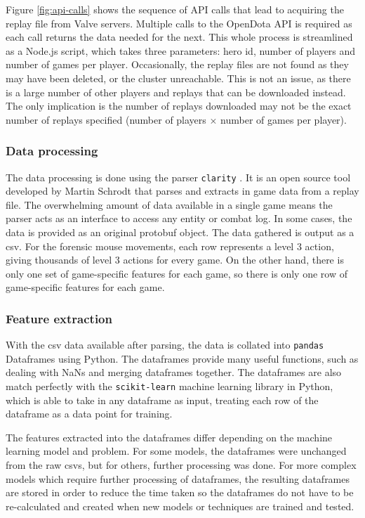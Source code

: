 \documentclass{SizheArticle}
\begin{document}
Figure \ref{fig:api-calls} shows the sequence of API calls that lead to acquiring the replay file from Valve servers. Multiple calls to the OpenDota API is required as each call returns the data needed for the next. This whole process is streamlined as a Node.js script, which takes three parameters: hero id, number of players and number of games per player. Occasionally, the replay files are not found as they may have been deleted, or the cluster unreachable. This is not an issue, as there is a large number of other players and replays that can be downloaded instead. The only implication is the number of replays downloaded may not be the exact number of replays specified (number of players $\times$ number of games per player).

\subsubsection{Data processing}
The data processing is done using the parser \texttt{clarity} \cite{clarity}. It is an open source tool developed by Martin Schrodt that parses and extracts in game data from a replay file. The overwhelming amount of data available in a single game means the parser acts as an interface to access any entity or combat log. In some cases, the data is provided as an original protobuf object. The data gathered is output as a csv. For the forensic mouse movements, each row represents a level 3 action, giving thousands of level 3 actions for every game. On the other hand, there is only one set of game-specific features for each game, so there is only one row of game-specific features for each game. 


\subsubsection{Feature extraction}
With the csv data available after parsing, the data is collated into \texttt{pandas} Dataframes using Python. The dataframes provide many useful functions, such as dealing with NaNs and merging dataframes together. The dataframes are also match perfectly with the \texttt{scikit-learn} machine learning library in Python, which is able to take in any dataframe as input, treating each row of the dataframe as a data point for training. 

The features extracted into the dataframes differ depending on the machine learning model and problem. For some models, the dataframes were unchanged from the raw csvs, but for others, further processing was done. For more complex models which require further processing of dataframes, the resulting dataframes are stored in order to reduce the time taken so the dataframes do not have to be re-calculated and created when new models or techniques are trained and tested. 
\end{document}
